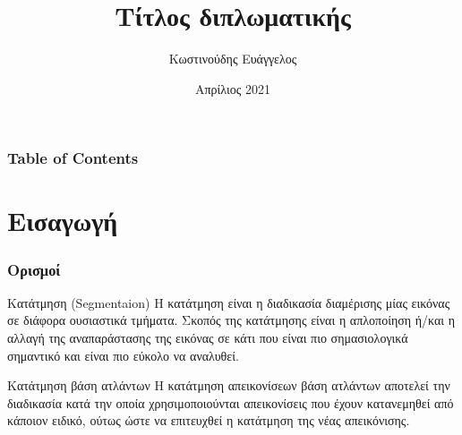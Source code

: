 \documentclass{beamer}
\title[Short title] {Τίτλος διπλωματικής}
\institute 
{
    Αριστοτέλειο Πανεπιστήμιο Θεσσαλονίκης \\
    Τμήμα Ηλεκτρολόγων Μηχανικών και Μηχανικών Υπολογιστών \\
    Τομέας Ηλεκτρονικής και Υπολογιστών
}
\author {Κωστινούδης Ευάγγελος}
\date{Απρίλιος 2021}
\begin{document}
\begin{frame}

\maketitle


\end{frame}

\begin{frame}
\frametitle{Table of Contents}
\tableofcontents
\end{frame}

\section{Εισαγωγή}

\begin{frame}
\frametitle{Ορισμοί}
\begin{block}{Κατάτμηση (Segmentaion)}
Η κατάτμηση είναι η διαδικασία διαμέρισης μίας εικόνας σε διάφορα ουσιαστικά
τμήματα. Σκοπός της κατάτμησης είναι η απλοποίηση ή/και η αλλαγή της
αναπαράστασης της εικόνας σε κάτι που είναι πιο σημασιολογικά σημαντικό και
είναι πιο εύκολο να αναλυθεί.
\end{block} \pause

\begin{block}{Κατάτμηση βάση ατλάντων}
Η κατάτμηση απεικονίσεων βάση ατλάντων αποτελεί την διαδικασία κατά την οποία
χρησιμοποιούνται απεικονίσεις που έχουν κατανεμηθεί από κάποιον ειδικό, ούτως
ώστε να επιτευχθεί η κατάτμηση της νέας απεικόνισης.
\end{block} 
\end{frame}
\end{document}
